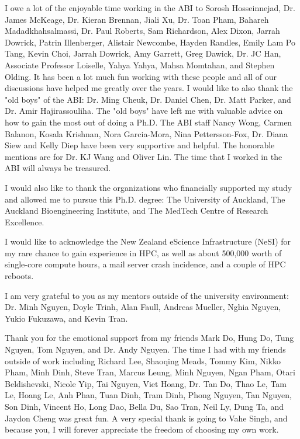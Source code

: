 \begin{acknowledgements}
    
    I owe a lot of the enjoyable time working in the ABI to Sorosh Hosseinnejad, Dr. James McKeage, Dr. Kieran Brennan, Jiali Xu, Dr. Toan Pham, Bahareh Madadkhahsalmassi, Dr. Paul Roberts, Sam Richardson, Alex Dixon, Jarrah Dowrick, Patrin Illenberger, Alistair Newcombe, Hayden Randles, Emily Lam Po Tang, Kevin Choi, Jarrah Dowrick, Amy Garrett, Greg Dawick, Dr. JC Han, Associate Professor Loiselle, Yahya Yahya, Mahsa Momtahan, and Stephen Olding. It has been a lot much fun working with these people and all of our discussions have helped me greatly over the years. I would like to also thank the "old boys" of the ABI: Dr. Ming Cheuk, Dr. Daniel Chen, Dr. Matt Parker, and Dr. Amir Hajirassouliha. The "old boys" have left me with valuable advice on how to gain the most out of doing a Ph.D. The ABI staff Nancy Wong, Carmen Balanon, Kosala Krishnan, Nora Garcia-Mora, Nina Pettersson-Fox, Dr. Diana Siew and Kelly Diep have been very supportive and helpful. The honorable mentions are for Dr. KJ Wang and Oliver Lin. The time that I worked in the ABI will always be treasured.
    
    
    I would also like to thank the organizations who financially supported my study and allowed me to pursue this Ph.D. degree: The University of Auckland, The Auckland Bioengineering Institute, and The MedTech Centre of Research Excellence. 
    
    
    I would like to acknowledge the New Zealand eScience Infrastructure (NeSI) for my rare chance to gain experience in HPC, as well as about 500,000 worth of single-core compute hours, a mail server crash incidence, and a couple of HPC reboots.
    
    
    I am very grateful to you as my mentors outside of the university environment: Dr. Minh Nguyen, Doyle Trinh, Alan Faull, Andreas Mueller, Nghia Nguyen, Yukio Fukuzawa, and Kevin Tran. 
    
    
    Thank you for the emotional support from my friends Mark Do, Hung Do, Tung Nguyen, Tom Nguyen, and Dr. Andy Nguyen. The time I had with my friends outside of work including Richard Lee, Shaoqing Meads, Tommy Kim, Nikko Pham, Minh Dinh, Steve Tran, Marcus Leung, Minh Nguyen, Ngan Pham, Otari Beldishevski, Nicole Yip, Tai Nguyen, Viet Hoang, Dr. Tan Do, Thao Le, Tam Le, Hoang Le, Anh Phan, Tuan Dinh, Tram Dinh, Phong Nguyen, Tan Nguyen, Son Dinh, Vincent Ho, Long Dao, Bella Du, Sao Tran, Neil Ly, Dung Ta, and Jaydon Cheng was great fun. A very special thank is going to Vahe Singh, and because you, I will forever appreciate the freedom of choosing my own work.
    

\end{acknowledgements}
